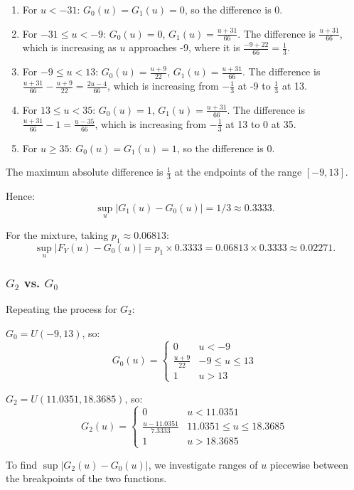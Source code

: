 \documentclass{article}
\begin{document}
\begin{enumerate}
    \item For \(u < -31\): \(G_0(u) = G_1(u) = 0\), so the difference is 0.
    \item For \(-31 \le u < -9\): \(G_0(u) = 0\), \(G_1(u) = \frac{u+31}{66}\). The difference is \(\frac{u+31}{66}\), which is increasing as \(u\) approaches -9, where it is \(\frac{-9 + 22}{66} = \frac{1}{3}\).
    \item For \(-9 \le u < 13\): \(G_0(u) = \frac{u+9}{22}\), \(G_1(u) = \frac{u+31}{66}\). The difference is \(\frac{u+31}{66} - \frac{u+9}{22} = \frac{2u-4}{66}\), which is increasing from \(-\frac{1}{3}\) at -9 to \(\frac{1}{3}\) at 13.
    \item For \(13 \le u < 35\): \(G_0(u) = 1\), \(G_1(u) = \frac{u+31}{66}\). The difference is \(\frac{u+31}{66} - 1 = \frac{u-35}{66}\), which is increasing from \(-\frac{1}{3}\) at 13 to 0 at 35.
    \item For \(u \ge 35\): \(G_0(u) = G_1(u) = 1\), so the difference is 0.
\end{enumerate}

The maximum absolute difference is \(\frac{1}{3}\) at the endpoints of the range \([-9,13]\).

Hence:
\[
\sup_u|G_1(u)-G_0(u)| = 1/3 \approx 0.3333.
\]

For the mixture, taking \(p_1 \approx 0.06813\):
\[
\sup_u|F_Y(u)-G_0(u)| = p_1 \times 0.3333 = 0.06813 \times 0.3333 \approx 0.02271.
\]

\subsubsection{\(G_2\) vs. \(G_0\)}

Repeating the process for \(G_2\):

\(G_0 = U(-9, 13)\), so:
\[
G_0(u)=\begin{cases}
0 & u < -9 \\
\frac{u+9}{22} & -9 \le u \le 13 \\
1 & u > 13
\end{cases}
\]

\(G_2 = U(11.0351, 18.3685)\), so:
\[
G_2(u)=\begin{cases}
0 & u < 11.0351 \\
\frac{u-11.0351}{7.3333} & 11.0351 \le u \le 18.3685 \\
1 & u > 18.3685
\end{cases}
\]

To find \(\sup|G_2(u)-G_0(u)|\), we investigate ranges of \(u\) piecewise between the breakpoints of the two functions.
\end{document}

